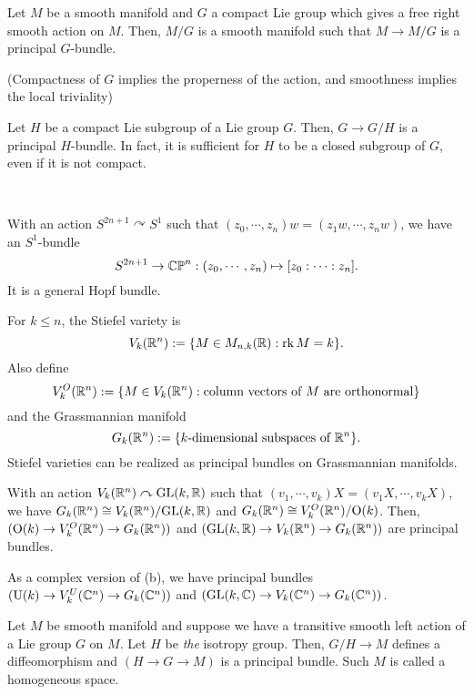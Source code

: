\documentclass{../../../small}
\begin{document}
\begin{thm}[Gleason, 1950]
Let $M$ be a smooth manifold and $G$ a compact Lie group which gives a free right smooth action on $M$.
Then, $M/G$ is a smooth manifold such that $M\to M/G$ is a principal $G$-bundle.
\end{thm}
(Compactness of $G$ implies the properness of the action, and smoothness implies the local triviality)
\begin{cor}[Samelson, 1941]
Let $H$ be a compact Lie subgroup of a Lie group $G$.
Then, $G\to G/H$ is a principal $H$-bundle.
In fact, it is sufficient for $H$ to be a closed subgroup of $G$, even if it is not compact.
\end{cor}
\begin{ex*}\,
\begin{parts}
\item
With an action $S^{2n+1}\curvearrowright S^1$ such that $(z_0,\cdots,z_n)w=(z_1w,\cdots,z_nw)$, we have an $S^1$-bundle
\[S^{2n+1}\to\mathbb{CP}^n:(z_0,\cdots,z_n)\mapsto[z_0:\cdots:z_n].\]
It is a general Hopf bundle.
\item
For $k\le n$, the Stiefel variety is
\[V_k(\mathbb{R}^n):=\{M\in M_{n,k}(\mathbb{R}):\operatorname{rk} M=k\}.\]
Also define
\[V_k^O(\mathbb{R}^n):=\{M\in V_k(\mathbb{R}^n):\text{column vectors of $M$ are orthonormal}\}\]
and the Grassmannian manifold
\[G_k(\mathbb{R}^n):=\{\text{$k$-dimensional subspaces of $\mathbb{R}^n$}\}.\]
Stiefel varieties can be realized as principal bundles on Grassmannian manifolds.

With an action $V_k(\mathbb{R}^n)\curvearrowright\mathrm{GL}(k,\mathbb{R})$ such that $(v_1,\cdots,v_k)X=(v_1X,\cdots,v_kX)$, we have $G_k(\mathbb{R}^n)\cong V_k(\mathbb{R}^n)/\mathrm{GL}(k,\mathbb{R})$ and $G_k(\mathbb{R}^n)\cong V_k^O(\mathbb{R}^n)/\mathrm{O}(k)$.
Then, $(\mathrm{O}(k)\to V_k^O(\mathbb{R}^n)\to G_k(\mathbb{R}^n))$ and $(\mathrm{GL}(k,\mathbb{R})\to V_k(\mathbb{R}^n)\to G_k(\mathbb{R}^n))$ are principal bundles.
\item
As a complex version of (b), we have principal bundles $(\mathrm{U}(k)\to V_k^U(\mathbb{C}^n)\to G_k(\mathbb{C}^n))$ and $(\mathrm{GL}(k,\mathbb{C})\to V_k(\mathbb{C}^n)\to G_k(\mathbb{C}^n))$.
\end{parts}
\end{ex*}


\begin{thm}
Let $M$ be smooth manifold and suppose we have a transitive smooth left action of a Lie group $G$ on $M$.
Let $H$ be \emph{the} isotropy group.
Then, $G/H\to M$ defines a diffeomorphism and $(H\to G\to M)$ is a principal bundle.
Such $M$ is called a homogeneous space.
\end{thm}
\end{document}
